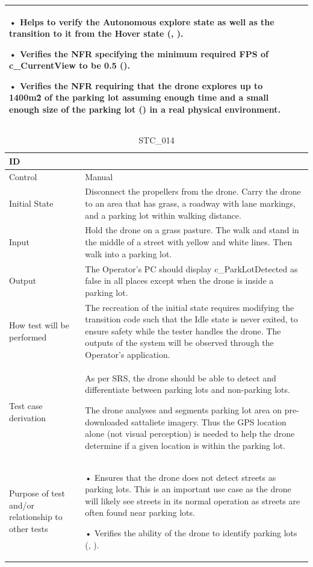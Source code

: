 \documentclass[12pt, titlepage]{article}
\begin{document}
\begin{table}[!h]
\begin{center}
\begin{tabular}{ | m{1.5cm} | m{15cm} | }
• Helps to verify the Autonomous explore state as well as the transition to it from the Hover state (\nameref{STA_003}, \nameref{TRANS_004}).

• Verifies the NFR specifying the minimum required FPS of c\_CurrentView to be 0.5 (\nameref{PERF_004}).

• Verifies the NFR requiring that the drone explores up to 1400m\^2 of the parking lot assuming enough time and a small enough size of the parking lot (\nameref{PERF_001}) in a real physical environment.
\\ 
\hline
\end{tabular}
\end{center}
\end{table}



\begin{table}[!h]
\begin{center}
\caption {STC\_014}
\label{tab:STC_014}
\begin{tabular}{ | m{3.2cm} | m{12.2cm} | } 
\hline
ID & \nameref{tab:STC_014} \\ 
\hline
Control & Manual \\ 
\hline
Initial State & Disconnect the propellers from the drone. Carry the drone to an area that has grass,  a roadway with lane markings, and a parking lot within walking distance.  \\ 
\hline
Input & Hold the drone on a grass pasture. The walk and stand in the middle of a street with yellow and white lines. Then walk into a parking lot. \\ 
\hline
Output & The Operator's PC should display c\_ParkLotDetected as false in all places except when the drone is inside a parking lot. \\ 
\hline
How test will be performed & The recreation of the initial state requires modifying the transition code such that the Idle state is never exited, to ensure safety while the tester handles the drone. The outputs of the system will be observed through the Operator’s application. \\ 
\hline
Test case derivation & As per SRS, the drone should be able to detect and differentiate between parking lots and non-parking lots. 

The drone analyses and segments parking lot area on pre-downloaded sattaliete imagery. Thus the  GPS location alone (not visual perception) is needed to help the drone determine if a given location is within the parking lot.

 \\ 
\hline
Purpose of test and/or relationship to other tests & 
• Ensures that the drone does not detect streets as parking lots. This is an important use case as the drone will likely see streets in its normal operation as streets are often found near parking lots.

• Verifies the ability of the drone to identify parking lots (\nameref{GEN_001}, \nameref{SR_009}).
\\ 
\hline
\end{tabular}
\end{center}
\end{table}
\end{document}
